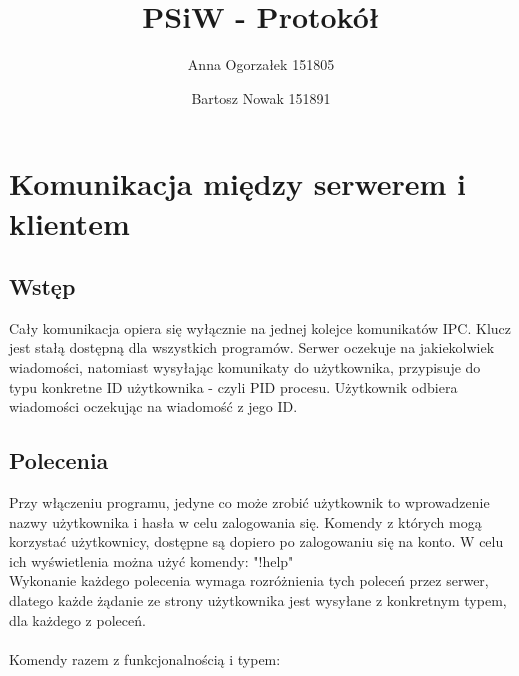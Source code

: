 \documentclass[11pt]{article}
\title{PSiW - Protokół}
\author{Anna Ogorzałek 151805 \and Bartosz Nowak 151891}
\date{}
\begin{document}
	\maketitle
	\section{Komunikacja między serwerem i klientem}
	\subsection{Wstęp}
	Cały komunikacja opiera się wyłącznie na jednej kolejce komunikatów IPC. Klucz jest stałą dostępną dla wszystkich programów. Serwer oczekuje na jakiekolwiek wiadomości, natomiast wysyłając komunikaty do użytkownika, przypisuje do typu konkretne ID użytkownika - czyli PID procesu. Użytkownik odbiera wiadomości oczekując na wiadomość z jego ID.
	\subsection{Polecenia}
	Przy włączeniu programu, jedyne co może zrobić użytkownik to wprowadzenie nazwy użytkownika i hasła w celu zalogowania się. Komendy z których mogą korzystać użytkownicy, dostępne są dopiero po zalogowaniu się na konto. W celu ich wyświetlenia można użyć komendy: "!help"\\
	Wykonanie każdego polecenia wymaga rozróżnienia tych poleceń przez serwer, dlatego każde żądanie ze strony użytkownika jest wysyłane z konkretnym typem, dla każdego z poleceń.\\\\ Komendy razem z funkcjonalnością i typem:
	
\end{document}

